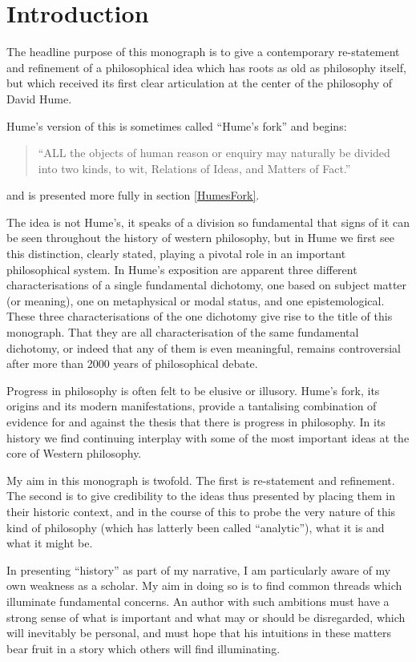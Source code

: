 \section{Introduction}\label{Introduction}

The headline purpose of this monograph is to give a contemporary re-statement and refinement of a philosophical idea which has roots as old as philosophy itself, but which received its first clear articulation at the center of the philosophy of David Hume.

Hume's version of this is sometimes called ``Hume's fork'' and begins:

\begin{quote}
``ALL the objects of human reason or enquiry may naturally be divided into two kinds, to wit, Relations of Ideas, and Matters of Fact.''
\end{quote}

and is presented more fully in section \ref{HumesFork}.

The idea is not Hume's, it speaks of a division so fundamental that signs of it can be seen throughout the history of western philosophy, but in Hume we first see this distinction, clearly stated, playing a pivotal role in an important philosophical system.
In Hume's exposition are apparent three different characterisations of a single fundamental dichotomy, one based on subject matter (or meaning), one on metaphysical or modal status, and one epistemological.
These three characterisations of the one dichotomy give rise to the title of this monograph.
That they are all characterisation of the same fundamental dichotomy, or indeed that any of them is even meaningful, remains controversial after more than 2000 years of philosophical debate. 


Progress in philosophy is often felt to be elusive or illusory.
Hume's fork, its origins and its modern manifestations, provide a tantalising combination of evidence for and against the thesis that there is progress in philosophy.
In its history we find continuing interplay with some of the most important ideas at the core of Western philosophy.

My aim in this monograph is twofold.
The first is re-statement and refinement.
The second is to give credibility to the ideas thus presented by placing them in their historic context, and in the course of this to probe the very nature of this kind of philosophy (which has latterly been called ``analytic''), what it is and what it might be.

In presenting ``history'' as part of my narrative, I am particularly aware of my own weakness as a scholar.
My aim in doing so is to find common threads which illuminate fundamental concerns.
An author with such ambitions must have a strong sense of what is important and what may or should be disregarded, which will inevitably be personal, and must hope that his intuitions in these matters bear fruit in a story which others will find illuminating.